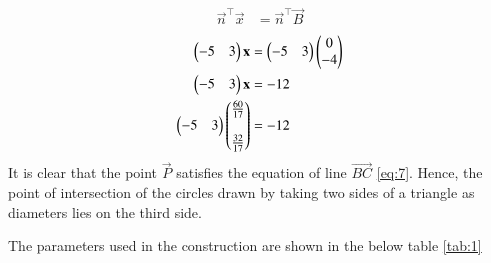 \documentclass[journal,12pt,twocolumn]{IEEEtran}
\begin{document}
\begin{enumerate}
\begin{align}
\vec{n}^\top\vec{x} &= \vec{n}^\top\vec{B}
\end{align}
\begin{align}
\begin{pmatrix}-5&3\end{pmatrix}\mathbf{x} &= \begin{pmatrix}-5&3\end{pmatrix}\begin{pmatrix}0\\-4\end{pmatrix}\\
\begin{pmatrix}-5&3\end{pmatrix}\mathbf{x} &= -12
\label{eq:7}\\
\begin{pmatrix}-5&3\end{pmatrix}\begin{pmatrix}\frac{60}{17}\\\\\frac{32}{17}\end{pmatrix} &= -12
\end{align}
It is clear that the point $\vec{P}$ satisfies the equation of line $\vec{BC}$ \eqref{eq:7}. Hence, the point of intersection of the circles drawn by taking two sides of a triangle as diameters lies on the third side.

The parameters used in the construction are shown in the below table \ref{tab:1}

\begin{table}[h]
\centering

\caption{}
\label{tab:1}
\end{table}
\end{enumerate}
\end{document}
